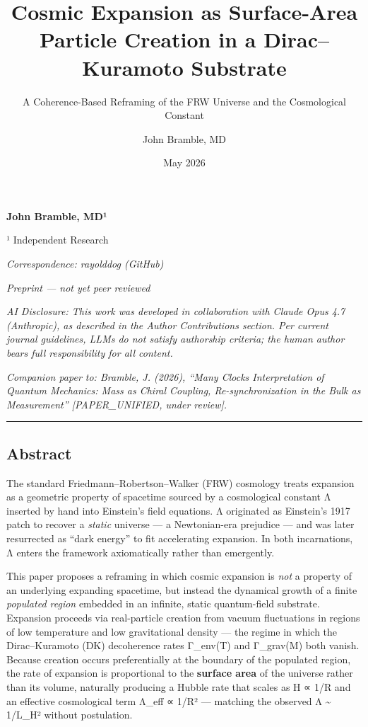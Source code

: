 \documentclass[
]{article}
\title{Cosmic Expansion as Surface-Area Particle Creation in a
Dirac--Kuramoto Substrate}
\subtitle{A Coherence-Based Reframing of the FRW Universe and the
Cosmological Constant}
\author{John Bramble, MD}
\date{May 2026}
\begin{document}
\maketitle

{
\setcounter{tocdepth}{2}
\tableofcontents
}
\textbf{John Bramble, MD¹}

¹ Independent Research

\emph{Correspondence: rayolddog (GitHub)}

\emph{Preprint --- not yet peer reviewed}

\emph{AI Disclosure: This work was developed in collaboration with
Claude Opus 4.7 (Anthropic), as described in the Author Contributions
section. Per current journal guidelines, LLMs do not satisfy authorship
criteria; the human author bears full responsibility for all content.}

\emph{Companion paper to: Bramble, J. (2026), ``Many Clocks
Interpretation of Quantum Mechanics: Mass as Chiral Coupling,
Re-synchronization in the Bulk as Measurement'' {[}PAPER\_UNIFIED, under
review{]}.}

\begin{center}\rule{0.5\linewidth}{0.5pt}\end{center}

\subsection{Abstract}\label{abstract}

The standard Friedmann--Robertson--Walker (FRW) cosmology treats
expansion as a geometric property of spacetime sourced by a cosmological
constant Λ inserted by hand into Einstein's field equations. Λ
originated as Einstein's 1917 patch to recover a \emph{static} universe
--- a Newtonian-era prejudice --- and was later resurrected as ``dark
energy'' to fit accelerating expansion. In both incarnations, Λ enters
the framework axiomatically rather than emergently.

This paper proposes a reframing in which cosmic expansion is \emph{not}
a property of an underlying expanding spacetime, but instead the
dynamical growth of a finite \emph{populated region} embedded in an
infinite, static quantum-field substrate. Expansion proceeds via
real-particle creation from vacuum fluctuations in regions of low
temperature and low gravitational density --- the regime in which the
Dirac--Kuramoto (DK) decoherence rates Γ\_env(T) and Γ\_grav(M) both
vanish. Because creation occurs preferentially at the boundary of the
populated region, the rate of expansion is proportional to the
\textbf{surface area} of the universe rather than its volume, naturally
producing a Hubble rate that scales as H ∝ 1/R and an effective
cosmological term Λ\_eff ∝ 1/R² --- matching the observed Λ
\textasciitilde{} 1/L\_H² without postulation.
\end{document}
